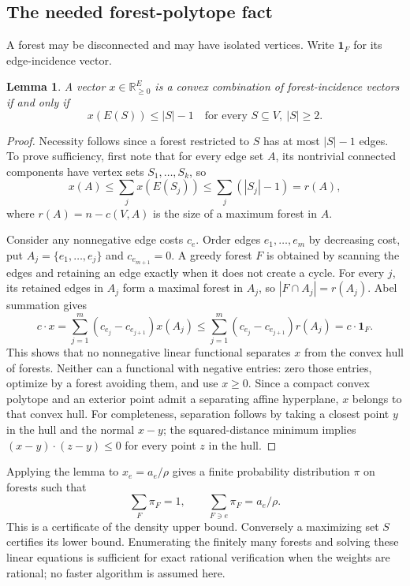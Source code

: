 \documentclass[11pt,a4paper]{article}
\newtheorem{lemma}[theorem]{Lemma}
\theoremstyle{definition}\newtheorem{definition}[theorem]{Definition}
\theoremstyle{remark}\newtheorem{remark}[theorem]{Remark}
\newcommand{\R}{\mathbb R}\newcommand{\C}{\mathbb C}\newcommand{\N}{\mathbb N}
\numberwithin{equation}{section}
\begin{document}
\subsection{The needed forest-polytope fact}\label{R04-sec-2}
A forest may be disconnected and may have isolated vertices. Write $\mathbf1_F$ for its edge-incidence vector.
\begin{lemma}\label{R04-forestpoly}
A vector $x\in\R_{\geq0}^E$ is a convex combination of forest-incidence vectors if and only if
\begin{equation}\label{R04-forestconstr}
x(E(S))\leq|S|-1\quad\text{for every }S\subseteq V,\ |S|\geq2.
\end{equation}
\end{lemma}
\begin{proof}
Necessity follows since a forest restricted to $S$ has at most $|S|-1$ edges. To prove sufficiency, first note that for every edge set $A$, its nontrivial connected components have vertex sets $S_1,\ldots,S_k$, so
\[
x(A)\leq\sum_jx(E(S_j))\leq\sum_j(|S_j|-1)=r(A),
\]
where $r(A)=n-c(V,A)$ is the size of a maximum forest in $A$.

Consider any nonnegative edge costs $c_e$. Order edges $e_1,\ldots,e_m$ by decreasing cost, put $A_j=\{e_1,\ldots,e_j\}$ and $c_{e_{m+1}}=0$. A greedy forest $F$ is obtained by scanning the edges and retaining an edge exactly when it does not create a cycle. For every $j$, its retained edges in $A_j$ form a maximal forest in $A_j$, so $|F\cap A_j|=r(A_j)$. Abel summation gives
\[
c\cdot x=\sum_{j=1}^m(c_{e_j}-c_{e_{j+1}})x(A_j)
\leq\sum_{j=1}^m(c_{e_j}-c_{e_{j+1}})r(A_j)=c\cdot\mathbf1_F.
\]
This shows that no nonnegative linear functional separates $x$ from the convex hull of forests. Neither can a functional with negative entries: zero those entries, optimize by a forest avoiding them, and use $x\geq0$. Since a compact convex polytope and an exterior point admit a separating affine hyperplane, $x$ belongs to that convex hull. For completeness, separation follows by taking a closest point $y$ in the hull and the normal $x-y$; the squared-distance minimum implies $(x-y)\cdot(z-y)\leq0$ for every point $z$ in the hull.
\end{proof}
Applying the lemma to $x_e=a_e/\rho$ gives a finite probability distribution $\pi$ on forests such that
\begin{equation}\label{R04-decomp}
\sum_F\pi_F=1,\qquad\sum_{F\ni e}\pi_F=a_e/\rho.
\end{equation}
This is a certificate of the density upper bound. Conversely a maximizing set $S$ certifies its lower bound. Enumerating the finitely many forests and solving these linear equations is sufficient for exact rational verification when the weights are rational; no faster algorithm is assumed here.
\end{document}
